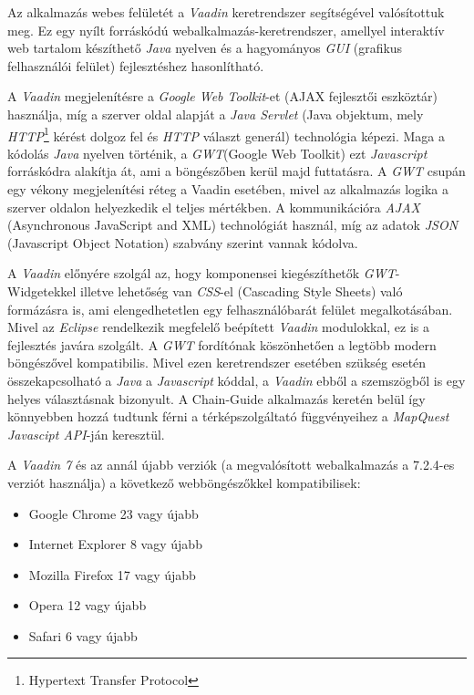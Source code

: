 \par Az alkalmazás webes felületét a \textit{Vaadin} keretrendszer segítségével valósítottuk meg. Ez egy nyílt forráskódú webalkalmazás-keretrendszer, amellyel interaktív web tartalom készíthető \textit{Java} nyelven és a hagyományos \textit{GUI} (grafikus felhasználói felület) fejlesztéshez hasonlítható. 
\par A \textit{Vaadin} megjelenítésre a \textit{Google Web Toolkit}-et (AJAX fejlesztői eszköztár) használja, míg a szerver oldal alapját a \textit{Java Servlet}  (Java objektum, mely \textit{HTTP}\footnote{Hypertext Transfer Protocol} kérést dolgoz fel és \textit{HTTP} választ generál) technológia képezi. Maga a kódolás \textit{Java} nyelven történik, a \textit{GWT}(Google Web Toolkit) ezt \textit{Javascript} forráskódra alakítja át, ami a böngészőben kerül majd futtatásra. A \textit{GWT} csupán egy vékony megjelenítési réteg a Vaadin esetében, mivel az alkalmazás logika a szerver oldalon helyezkedik el teljes mértékben. A kommunikációra \textit{AJAX} (Asynchronous JavaScript and XML) technológiát használ, míg az adatok \textit{JSON} (Javascript Object Notation) szabvány szerint vannak kódolva.
\par A\textit{ Vaadin} előnyére szolgál az, hogy komponensei kiegészíthetők \textit{GWT}-Widgetekkel illetve lehetőség van  \textit{CSS}-el (Cascading Style Sheets) való formázásra is, ami elengedhetetlen egy felhasználóbarát felület megalkotásában. Mivel az \textit{Eclipse} rendelkezik megfelelő beépített \textit{Vaadin} modulokkal, ez is a fejlesztés javára szolgált. A \textit{GWT} fordítónak köszönhetően a legtöbb modern böngészővel kompatibilis. Mivel ezen keretrendszer esetében szükség esetén összekapcsolható a \textit{Java} a\textit{ Javascript} kóddal, a \textit{Vaadin} ebből a szemszögből is egy helyes választásnak bizonyult. A Chain-Guide alkalmazás keretén belül így könnyebben hozzá tudtunk férni a térképszolgáltató függvényeihez a \textit{MapQuest Javascipt API}-ján keresztül. 
\par A \textit{Vaadin 7} és az annál újabb verziók  (a megvalósított webalkalmazás a 7.2.4-es verziót használja) a következő webböngészőkkel kompatibilisek: 
\par
\begin{itemize}
  \item Google Chrome 23 vagy újabb
  \item Internet Explorer 8 vagy újabb
  \item Mozilla Firefox 17 vagy újabb
  \item Opera 12 vagy újabb
  \item Safari 6 vagy újabb 
\end{itemize}

